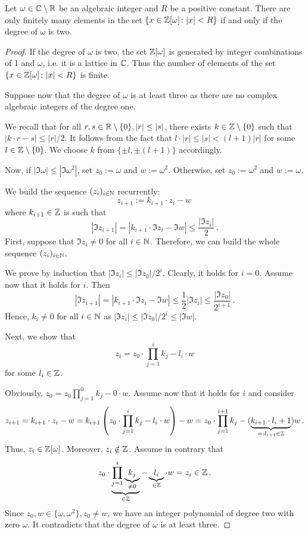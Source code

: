 \begin{lem}
\label{lem:numElemCC}
Let $\omega\in \mathbb{C}\setminus\mathbb{R}$ be an algebraic integer and $R$ be a positive constant. There are only finitely many elements in the set $\left\{x \in\mathbb{Z}[\omega] \colon |x|<R\right\}$ if and only if the degree of $\omega$ is two.  
\end{lem}
\begin{proof}
If the degree of $\omega$ is two, the set $\mathbb{Z}[\omega]$ is generated by integer combinations of 1 and $\omega$, i.e. it is a lattice in $\mathbb{C}$. Thus the number of elements of the set $\left\{x \in\mathbb{Z}[\omega] \colon |x|<R\right\}$ is finite.

Suppose now that the degree of $\omega$ is at least three as there are no complex algebraic integers of the degree one. 


We recall that for all $r,s\in\mathbb{R}\setminus\{0\}, |r|\leq|s|$, there exists $k\in\mathbb{Z}\setminus\{0\}$ such that $|k\cdot r -s|\leq |r|/2$. It follows from the fact that $l\cdot |r| \leq |s| <(l+1)|r| $ for some $l\in\mathbb{Z}\setminus\{0\}$. We choose $k$ from $\{\pm l,\pm(l+1)\}$ accordingly. 
 
Now, if $|\Im \omega|\leq|\Im \omega^2|$, set $z_0:=\omega$ and $w:=\omega^2$. Otherwise, set $z_0:=\omega^2$ and $w:=\omega$.   

We build the sequence $(z_i)_{i\in\mathbb{N}}$ recurrently:
$$
z_{i+1}:=k_{i+1} \cdot z_{i}-w\, 
$$
where $k_{i+1}\in\mathbb{Z}$ is such that 
$$
|\Im z_{i+1}|=|k_{i+1} \cdot\Im z_{i}-\Im w|\leq \frac{|\Im z_{i}|}{2}\,.
$$
First, suppose that $\Im z_{i} \neq 0$ for all $i\in\mathbb{N}$. Therefore, we can build the whole sequence $(z_i)_{i\in\mathbb{N}}$.

We prove by induction that $|\Im z_i|\leq |\Im z_0|/2^i$. Clearly, it holds for $i=0$. Assume now that it holds for $i$. Then 
$$
|\Im z_{i+1}|= |k_{i+1} \cdot \Im z_{i}- \Im w|\leq \frac{1}{2}|\Im z_i|\leq \frac{|\Im z_0|}{2^{i+1}}\,. 
$$
Hence, $k_i\neq 0$ for all $i\in\mathbb{N}$ as $|\Im z_i|\leq |\Im z_0|/2^i \leq |\Im w|$.

Next, we show that
$$
z_i=z_0 \cdot \prod_{j=1}^i k_j- l_i\cdot w
$$
for some $l_i\in\mathbb{Z}$. 

Obviously, $z_0=z_0 \prod_{j=1}^0 k_j - 0\cdot w$. Assume now that it holds for $i$ and consider
$$
z_{i+1}=k_{i+1} \cdot z_{i}-w= k_{i+1}\left(z_0 \cdot \prod_{j=1}^i k_j- l_i\cdot w\right) -w=z_0 \cdot \prod_{j=1}^{i+1} k_j - (\underbrace{k_{i+1}\cdot l_i +1}_{=:l_{i+1}\in\mathbb{Z}})w\,.
$$
Thus, $z_i\in\mathbb{Z}[\omega]$. Moreover, $z_i\notin \mathbb{Z}$. Assume in contrary that 
$$
z_0 \cdot \underbrace{\prod_{j=1}^i \underbrace{k_j}_{\neq0}}_{\in\mathbb{Z}}- \underbrace{l_i}_{\in\mathbb{Z}}\cdot w = z_i\in \mathbb{Z}\,.
$$
Since $z_0,w\in\{\omega, \omega^2\}, z_0\neq w$, we have an integer polynomial of degree two with zero $\omega$. It contradicts that the degree of $\omega$ is at least three.




\end{proof}
